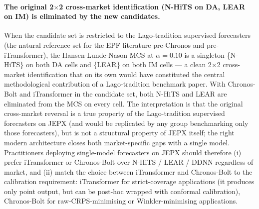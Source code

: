 \documentclass[review,3p,times,authoryear]{elsarticle}
\begin{document}
\paragraph{The original 2$\times$2 cross-market identification (N-HiTS on DA, LEAR on IM) is eliminated by the new candidates.}
When the candidate set is restricted to the Lago-tradition supervised forecasters (the natural reference set for the EPF literature pre-Chronos and pre-iTransformer), the Hansen-Lunde-Nason MCS at \(\alpha=0.10\) is a singleton \{N-HiTS\} on both DA cells and \{LEAR\} on both IM cells --- a clean 2\(\times\)2 cross-market identification that on its own would have constituted the central methodological contribution of a Lago-tradition benchmark paper. With Chronos-Bolt and iTransformer in the candidate set, both N-HiTS and LEAR are eliminated from the MCS on every cell. The interpretation is that the original cross-market reversal is a true property of the Lago-tradition supervised forecasters on JEPX (and would be replicated by any group benchmarking only those forecasters), but is not a structural property of JEPX itself; the right modern architecture closes both market-specific gaps with a single model. Practitioners deploying single-model forecasters on JEPX should therefore (i) prefer iTransformer or Chronos-Bolt over N-HiTS / LEAR / DDNN regardless of market, and (ii) match the choice between iTransformer and Chronos-Bolt to the calibration requirement: iTransformer for strict-coverage applications (it produces only point output, but can be post-hoc wrapped with conformal calibration), Chronos-Bolt for raw-CRPS-minimising or Winkler-minimising applications.
\end{document}
